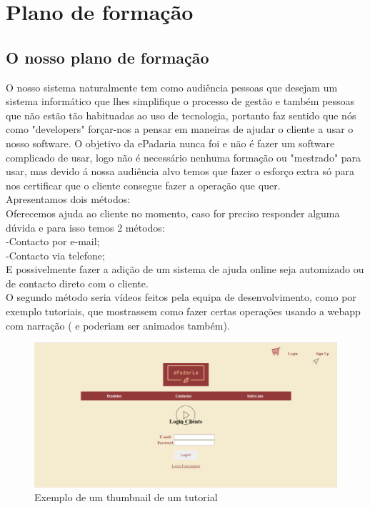 \chapter{Plano de formação}
\label{plano_de_formaçao}
\section{O nosso plano de formação}
O nosso sistema naturalmente tem como audiência pessoas que desejam um sistema informático que lhes simplifique o processo de gestão e também pessoas que não estão tão habituadas ao uso de tecnologia, portanto faz sentido que nós como "developers" forçar-nos a pensar em maneiras de ajudar o cliente a usar o nosso software. O objetivo da ePadaria nunca foi e não é fazer um software complicado de usar, logo não é necessário nenhuma formação ou "mestrado" para usar, mas devido á nossa audiência alvo temos que fazer o esforço extra só para nos certificar que o cliente consegue fazer a operação que quer.\\
Apresentamos dois métodos:\\
Oferecemos ajuda ao cliente no momento, caso for preciso responder alguma dúvida e para isso temos 2 métodos:\\
 -Contacto por e-mail;\\
 -Contacto via telefone;\\
	E possivelmente fazer a adição de um sistema de ajuda online seja automizado ou de contacto direto com o cliente.\\
O segundo método seria vídeos feitos pela equipa de desenvolvimento, como por exemplo tutoriais, que mostrassem como fazer certas operações usando a webapp com narração ( e poderiam ser animados também).\\
 \begin{figure}[H]
 	\centering
 	\includegraphics[width=15cm]{tutorial}
 	\caption{Exemplo de um thumbnail de um tutorial}
 	\label{fig:tutorial}
 \end{figure}